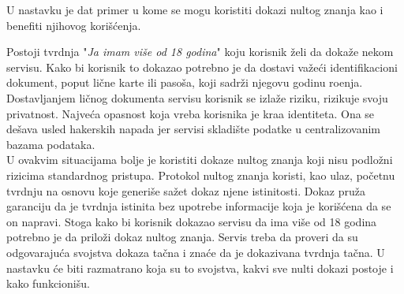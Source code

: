 U nastavku je dat primer u kome se  mogu koristiti dokazi nultog znanja kao i  benefiti njihovog  kori\v s\' cenja. \\
\begin{npra}
Postoji tvrdnja "{\it Ja imam vi\v se od 18 godina}" koju korisnik \v zeli da doka\v ze nekom servisu. Kako bi korisnik to dokazao potrebno je da dostavi va\v ze\' ci identifikacioni dokument, poput li\v cne karte ili paso\v sa, koji sadr\v zi njegovu godinu ro\dj enja. Dostavljanjem li\v cnog dokumenta servisu korisnik se izla\v ze riziku, rizikuje svoju privatnost. Najve\' ca opasnost koja vreba korisnika je kra\dj a identiteta. Ona se de\v sava usled hakerskih napada jer servisi skladi\v ste podatke u centralizovanim bazama podataka. \\
U ovakvim situacijama bolje je koristiti dokaze nultog znanja koji nisu podlo\v zni rizicima standardnog pristupa. Protokol nultog znanja koristi, kao ulaz, po\v cetnu tvrdnju na osnovu koje generi\v se sa\v zet dokaz njene istinitosti. Dokaz pru\v za garanciju da je tvrdnja istinita bez upotrebe informacije koja je kori\v s\' cena da se on napravi. Stoga kako bi korisnik dokazao servisu da ima vi\v se od 18 godina potrebno je da prilo\v zi dokaz nultog znanja. Servis treba da proveri da su  odgovaraju\' ca svojstva dokaza ta\v cna i zna\' ce da je dokazivana tvrdnja ta\v cna. U nastavku \' ce biti razmatrano koja su to svojstva, kakvi sve nulti dokazi postoje i kako funkcioni\v su. 
\end{npra}


